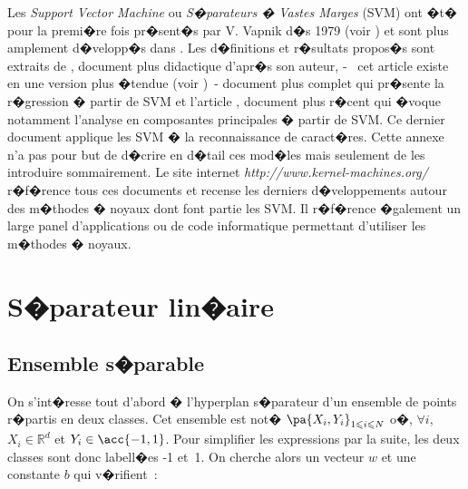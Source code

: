 
\firstpassagedo{}

\firstpassagedo{}



\label{annexe_svm}


Les \emph{Support Vector Machine} ou \emph{S�parateurs � Vastes Marges} (SVM) ont �t� pour la premi�re fois pr�sent�s par V. Vapnik d�s 1979 (voir ) et sont plus amplement d�velopp�s dans . Les d�finitions et r�sultats propos�s sont extraits de , document plus didactique d'apr�s son auteur,  -~ cet article existe en une version plus �tendue (voir )~- document plus complet qui pr�sente la r�gression � partir de SVM et l'article , document plus r�cent qui �voque notamment l'analyse en composantes principales � partir de SVM. Ce dernier document applique les SVM � la reconnaissance de caract�res. Cette annexe n'a pas pour but de d�crire en d�tail ces mod�les mais seulement de les introduire sommairement. Le site internet \textit{http://www.kernel-machines.org/} r�f�rence tous ces documents et recense les derniers d�veloppements autour des m�thodes � noyaux dont font partie les SVM. Il r�f�rence �galement un large panel d'applications ou de code informatique permettant d'utiliser les m�thodes � noyaux.



\section{S�parateur lin�aire}

\label{svm_separateur_lineaire}

\subsection{Ensemble s�parable}


On s'int�resse tout d'abord � l'hyperplan s�parateur d'un ensemble de points r�partis en deux classes. Cet ensemble est not� $\pa{X_i,Y_i}_{1 \leqslant i \leqslant N}$ o�, $\forall i$, $X_i \in \mathbb{R}^d$ et $Y_i \in \acc{-1,1}$. Pour simplifier les expressions par la suite, les deux classes sont donc labell�es -1 et~1. On cherche alors un vecteur $w$ et une constante $b$ qui v�rifient~:

